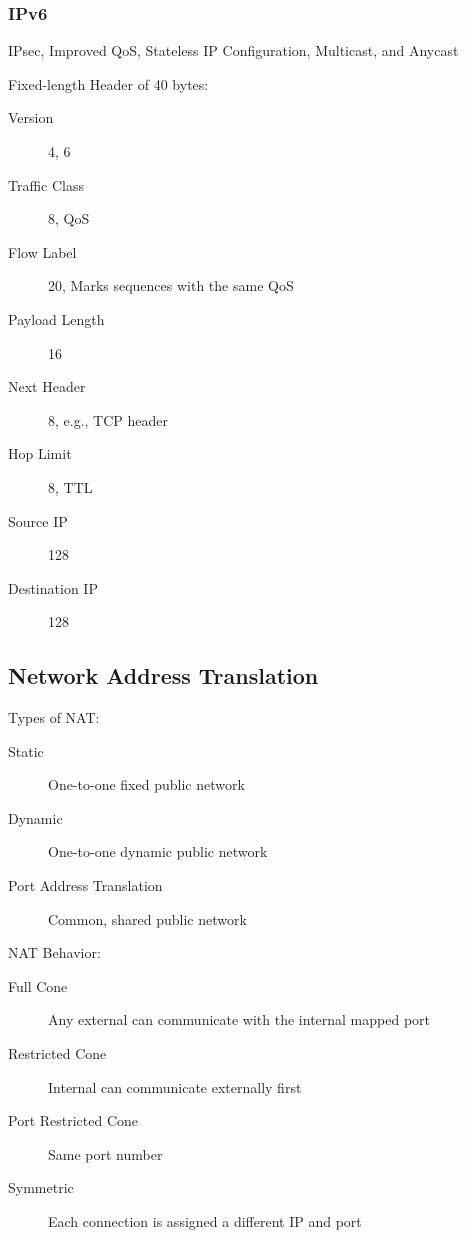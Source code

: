 \documentclass[11pt,journal,compsoc]{IEEEtran}
\begin{document}
\subsubsection{IPv6}

IPsec, Improved QoS, Stateless IP Configuration, Multicast, and Anycast

Fixed-length Header of 40 bytes:

\begin{description}
    \item[Version] 4, 6

    \item[Traffic Class] 8, QoS

    \item[Flow Label] 20, Marks sequences with the same QoS

    \item[Payload Length] 16

    \item[Next Header] 8, e.g., TCP header

    \item[Hop Limit] 8, TTL

    \item[Source IP] 128

    \item[Destination IP] 128
\end{description}


\subsection{Network Address Translation}

Types of NAT:

\begin{description}
    \item[Static] One-to-one fixed public network

    \item[Dynamic] One-to-one dynamic public network

    \item[Port Address Translation] Common, shared public network
\end{description}

NAT Behavior:

\begin{description}
    \item[Full Cone] Any external can communicate with the internal mapped port

    \item[Restricted Cone] Internal can communicate externally first

    \item[Port Restricted Cone] Same port number

    \item[Symmetric] Each connection is assigned a different IP and port
\end{description}
\end{document}
